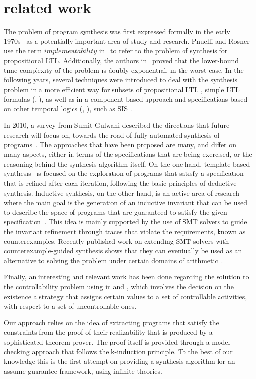 \section{related work}
\label{sec:related work}

The problem of program synthesis was first expressed formally in the early
1970s~\cite{manna1971toward} as a potentially important area of study and
research. 
Pnuelli and Rosner use the term
$\textit{implementability}$ in~\cite{Pnueli89} to refer to the problem of synthesis for
propositional LTL. Additionally, the authors in~\cite{Pnueli89} proved that the
lower-bound time complexity of the problem is doubly exponential, in the worst
case. In the following years, several techniques were introduced to deal with
the synthesis problem in a more efficient way for subsets of propositional LTL
\cite{Klein10}, simple LTL formulas (\cite{Bohy12}, \cite{Tini03}), as well as
in a component-based approach \cite{Chatterjee07} and specifications based on
other temporal logics (\cite{benevs2012factorization}, \cite{Hamza10}), such as SIS
\cite{Aziz95}.

In 2010, a survey from Sumit Gulwani described the 
directions that future research will focus on, towards the
road of fully automated synthesis of programs~\cite{gulwani2010dimensions}.
%
The approaches that have been proposed are many, and differ on many aspects,
either in terms of the specifications that are being exercised, or the reasoning
behind the synthesis algorithm itself. On the one hand, template-based
synthesis~\cite{srivastava2013template} is focused on the exploration of
programs that satisfy a specification that is refined after each
iteration, following the basic principles of deductive synthesis. Inductive
synthesis, on the other hand, is an active area of research where the main goal
is the generation of an inductive invariant that can be used to describe the
space of programs that are guaranteed to satisfy the given
specification~\cite{flener2001inductive}.
This idea is mainly supported by the use of SMT solvers to guide the invariant
refinement through traces that violate the requirements, known as
counterexamples. Recently published work on extending SMT solvers with
counterexample-guided synthesis shows that they can eventually be
used as an alternative to solving the problem under certain domains of
arithmetic~\cite{reynoldscounterexample}.

Finally, an interesting and relevant work has been done regarding the solution
to the controllability problem using in \cite{micheli_aaai_2012}
\cite{micheli_cp_2012} and \cite{micheli_constraints_2014}, which involves the
decision on the existence a strategy that assigns certain values to a set of
controllable activities, with respect to a set of uncontrollable ones.

Our approach relies on the idea of extracting programs that satisfy the
constraints from the proof of their realizability that is produced by a
sophisticated theorem prover. The proof itself is provided
through a model checking approach that follows the k-induction principle. To the
best of our knowledge this is the first attempt on providing a synthesis
algorithm for an assume-guarantee framework, using infinite theories.
